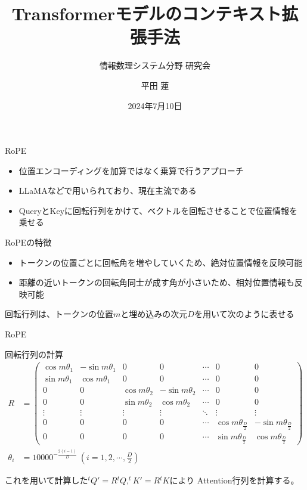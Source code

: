 \documentclass[dvipdfm, aspectratio=169]{beamer}
\title[研究会]{
    Transformerモデルのコンテキスト拡張手法
}
\subtitle[]{情報数理システム分野 研究会}
\author[平田 蓮]{平田 蓮}
\date{2024年7月10日}
\begin{document}
    \begin{frame}
        \titlepage
    \end{frame}
    \begin{frame}{RoPE}
        \begin{itemize}
            \item 位置エンコーディングを加算ではなく乗算で行うアプローチ
            \item LLaMAなどで用いられており、現在主流である
            \item {
                QueryとKeyに回転行列をかけて、ベクトルを回転させることで位置情報を乗せる
            }
        \end{itemize}

        \begin{block}{RoPEの特徴}
            \begin{itemize}
                \item トークンの位置ごとに回転角を増やしていくため、絶対位置情報を反映可能
                \item 距離の近いトークンの回転角同士が成す角が小さいため、相対位置情報も反映可能
            \end{itemize}
        \end{block}

        回転行列は、トークンの位置$m$と埋め込みの次元$D$を用いて次のように表せる
    \end{frame}
    \begin{frame}{RoPE}
        \begin{block}{回転行列の計算}
            {\small
                \begin{align*}
                    R &= \begin{pmatrix}
                        \cos m\theta_1 & -\sin m\theta_1 & 0 & 0 & \cdots & 0 & 0 \\
                        \sin m\theta_1 & \cos m\theta_1 & 0 & 0 & \cdots & 0 & 0 \\
                        0 & 0 & \cos m\theta_2 & -\sin m\theta_2 & \cdots & 0 & 0 \\
                        0 & 0 & \sin m\theta_2 & \cos m\theta_2 & \cdots & 0 & 0 \\
                        \vdots & \vdots & \vdots & \vdots & \ddots & \vdots & \vdots \\
                        0 & 0 & 0 & 0 & \cdots & \cos m\theta_\frac{D}{2} & -\sin m\theta_\frac{D}{2} \\
                        0 & 0 & 0 & 0 & \cdots & \sin m\theta_\frac{D}{2} & \cos m\theta_\frac{D}{2}
                    \end{pmatrix} \\
                    \theta_i &= 10000^{-\frac{2(i-1)}{D}} \ \left(i = 1, 2, \cdots, \frac{D}{2}\right)
                \end{align*}
            }
        \end{block}
        これを用いて計算した$^t\!Q' = R{}^t\!Q, ^t\!K' = R{}^t\!K$により
        Attention行列を計算する。
    \end{frame}
\end{document}
